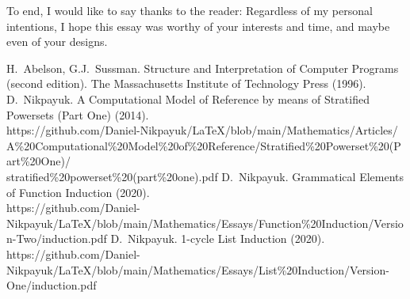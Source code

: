 \documentclass[twoside]{article}
\begin{document}
To end, I would like to say thanks to the reader: Regardless of my personal intentions, I hope this essay was worthy of your
interests and time, and maybe even of your designs.

\vfill

\begin{thebibliography}{99}
 H.~Abelson, G.J.~Sussman. Structure and Interpretation of Computer Programs (second edition).
               The Massachusetts Institute of Technology Press (1996).
 D.~Nikpayuk. A Computational Model of Reference by means of Stratified Powersets (Part One) (2014).\\
    https://github.com/Daniel-Nikpayuk/LaTeX/blob/main/Mathematics/Articles/\\
    A\%20Computational\%20Model\%20of\%20Reference/Stratified\%20Powerset\%20(Part\%20One)/\\
    stratified\%20powerset\%20(part\%20one).pdf
 D.~Nikpayuk. Grammatical Elements of Function Induction (2020).\\
    https://github.com/Daniel-Nikpayuk/LaTeX/blob/main/Mathematics/Essays/Function\%20Induction/Version-Two/induction.pdf
 D.~Nikpayuk. 1-cycle List Induction (2020).\\
    https://github.com/Daniel-Nikpayuk/LaTeX/blob/main/Mathematics/Essays/List\%20Induction/Version-One/induction.pdf
\end{thebibliography}
\end{document}
